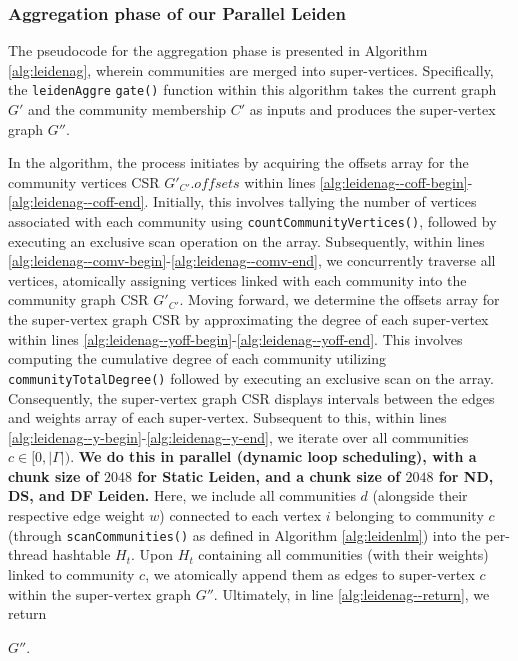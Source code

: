 \subsubsection{Aggregation phase of our Parallel Leiden}

The pseudocode for the aggregation phase is presented in Algorithm \ref{alg:leidenag}, wherein communities are merged into super-vertices. Specifically, the \texttt{leidenAggre} \texttt{gate()} function within this algorithm takes the current graph $G'$ and the community membership $C'$ as inputs and produces the super-vertex graph $G''$.



In the algorithm, the process initiates by acquiring the offsets array for the community vertices CSR $G'_{C'}.offsets$ within lines \ref{alg:leidenag--coff-begin}-\ref{alg:leidenag--coff-end}. Initially, this involves tallying the number of vertices associated with each community using \texttt{countCommunityVertices()}, followed by executing an exclusive scan operation on the array. Subsequently, within lines \ref{alg:leidenag--comv-begin}-\ref{alg:leidenag--comv-end}, we concurrently traverse all vertices, atomically assigning vertices linked with each community into the community graph CSR $G'_{C'}$. Moving forward, we determine the offsets array for the super-vertex graph CSR by approximating the degree of each super-vertex within lines \ref{alg:leidenag--yoff-begin}-\ref{alg:leidenag--yoff-end}. This involves computing the cumulative degree of each community utilizing \texttt{communityTotalDegree()} followed by executing an exclusive scan on the array. Consequently, the super-vertex graph CSR displays intervals between the edges and weights array of each super-vertex. Subsequent to this, within lines \ref{alg:leidenag--y-begin}-\ref{alg:leidenag--y-end}, we iterate over all communities $c \in [0, |\Gamma|)$. \textbf{We do this in parallel (dynamic loop scheduling), with a chunk size of $2048$ for Static Leiden, and a chunk size of $2048$ for ND, DS, and DF Leiden.} Here, we include all communities $d$ (alongside their respective edge weight $w$) connected to each vertex $i$ belonging to community $c$ (through \texttt{scanCommunities()} as defined in Algorithm \ref{alg:leidenlm}) into the per-thread hashtable $H_t$. Upon $H_t$ containing all communities (with their weights) linked to community $c$, we atomically append them as edges to super-vertex $c$ within the super-vertex graph $G''$. Ultimately, in line \ref{alg:leidenag--return}, we return $G''$.


